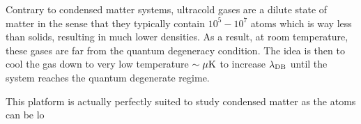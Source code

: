Contrary to condensed matter systems, ultracold gases are a dilute state of matter in the sense that they typically contain $10^5-10^7$ atoms which is way less than solids, resulting in much lower densities. As a result, at room temperature, these gases are far from the quantum degeneracy condition. The idea is then to cool the gas down to very low temperature $\sim \mu \rm{K}$ to increase $\lambda_{\rm{DB}}$ until the system reaches the quantum degenerate regime. 



This platform is actually perfectly suited to study condensed matter as the atoms can be lo